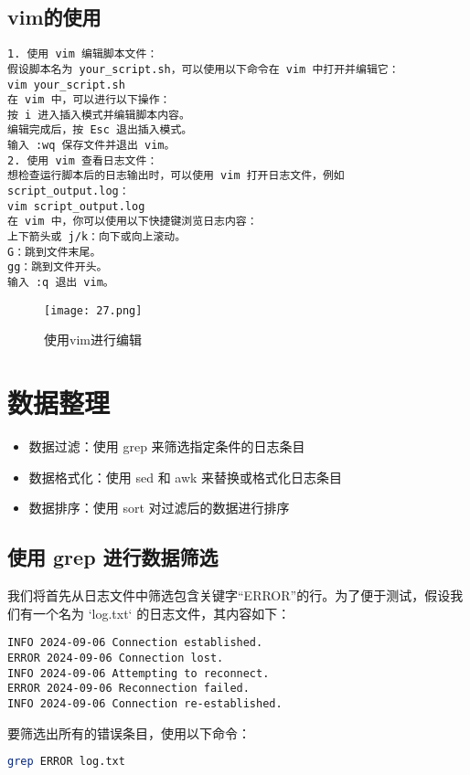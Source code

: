 \documentclass[a4paper, 12pt]{article}
\begin{document}
\subsection{vim的使用}  
\begin{lstlisting}
1. 使用 vim 编辑脚本文件：
假设脚本名为 your_script.sh，可以使用以下命令在 vim 中打开并编辑它：
vim your_script.sh
在 vim 中，可以进行以下操作：
按 i 进入插入模式并编辑脚本内容。
编辑完成后，按 Esc 退出插入模式。
输入 :wq 保存文件并退出 vim。
2. 使用 vim 查看日志文件：
想检查运行脚本后的日志输出时，可以使用 vim 打开日志文件，例如 script_output.log：
vim script_output.log
在 vim 中，你可以使用以下快捷键浏览日志内容：
上下箭头或 j/k：向下或向上滚动。
G：跳到文件末尾。
gg：跳到文件开头。
输入 :q 退出 vim。
\end{lstlisting}
\begin{figure}[H]
  \centering
    \texttt{[image: 27.png]}
  \caption{使用vim进行编辑}
   \end{figure}

\section{数据整理}
\begin{itemize}
    \item 数据过滤：使用  grep 来筛选指定条件的日志条目
    \item 数据格式化：使用 sed 和 awk 来替换或格式化日志条目
    \item 数据排序：使用 sort 对过滤后的数据进行排序
\end{itemize}

\subsection{使用 grep 进行数据筛选}
我们将首先从日志文件中筛选包含关键字“ERROR”的行。为了便于测试，假设我们有一个名为 `log.txt` 的日志文件，其内容如下：

\begin{lstlisting}
INFO 2024-09-06 Connection established.
ERROR 2024-09-06 Connection lost.
INFO 2024-09-06 Attempting to reconnect.
ERROR 2024-09-06 Reconnection failed.
INFO 2024-09-06 Connection re-established.
\end{lstlisting}

要筛选出所有的错误条目，使用以下命令：

\begin{lstlisting}[language=bash]
grep ERROR log.txt
\end{lstlisting}
\end{document}
